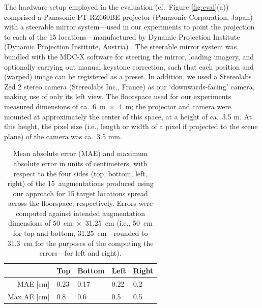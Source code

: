 \documentclass[review]{elsarticle}
\begin{document}
The hardware setup employed in the evaluation (cf.\ Figure \ref{fig:eval}(a)) comprised a Panasonic PT-RZ660BE projector (Panasonic Corporation, Japan) with a steerable mirror system---used in our experiments to point the projection to each of the 15 locations---manufactured by Dynamic Projection Institute (Dynamic Projection Institute, Austria) \cite{rupprecht2020information,Rupprecht2021}. The steerable mirror system was bundled with the MDC-X software for steering the mirror, loading imagery, and optionally carrying out manual keystone correction, such that each position and (warped) image can be registered as a preset. In addition, we used a Stereolabs Zed 2 stereo camera (Stereolabs Inc., France) as our `downwards-facing' camera, making use of only its left view. The floorspace used for our experiments measured dimensions of ca.\ 6~m~$\times$~4~m; the projector and camera were mounted at approximately the center of this space, at a height of ca.\ 3.5 m. At this height, the pixel size (i.e., length or width of a pixel if projected to the scene plane) of the camera was ca.\ 3.5 mm.

\begin{table}[ht!]
\caption{Mean absolute error (MAE) and maximum absolute error in units of centimeters, with respect to the four sides (top, bottom, left, right) of the 15~augmentations produced using our approach for 15 target locations spread across the floorspace, respectively. Errors were computed against intended augmentation dimensions of 50~cm~$\times$~31.25~cm (i.e., 50~cm for top and bottom, 31.25~cm---rounded to 31.3~cm for the purposes of the computing the errors---for left and right).} %
\label{table:length}
\centering
{\small
\begin{tabularx}{7.4cm}{r p{1cm} p{1cm} p{1cm} p{1cm}}
\toprule
  & Top & Bottom & Left & Right \\
\midrule
MAE {\tiny[cm]} & 0.23 & 0.17 & 0.22 & 0.2 \\
Max AE {\tiny[cm]} & 0.8 & 0.6 & 0.5 & 0.5 \\
\bottomrule
\end{tabularx}}
\end{table}
\end{document}
